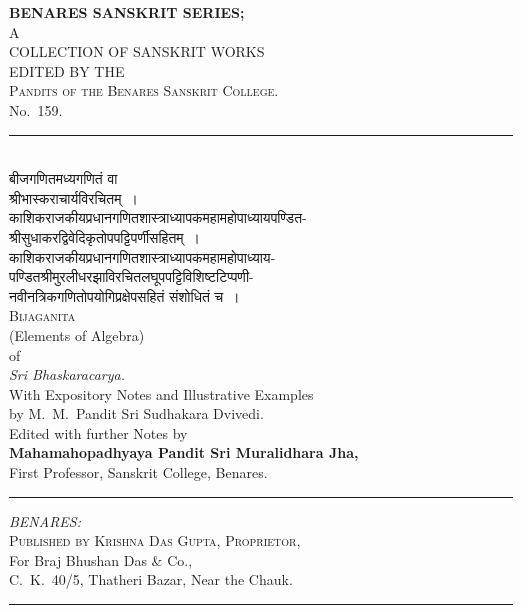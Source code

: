 \documentclass[11pt,a4paper]{article}
\newcommand{\longline}{\noindent\rule{\textwidth}{0.4pt}}
\newcommand{\shortline}{\noindent\rule{0.5\textwidth}{0.4pt}\par}
\begin{document}
\thispagestyle{empty}
\begin{center}
\vspace*{2cm}
{\LARGE\bfseries BENARES SANSKRIT SERIES;}\\[0.3cm]
{\large A}\\[0.2cm]
{\Large COLLECTION OF SANSKRIT WORKS}\\[0.4cm]
{\normalsize EDITED BY THE}\\[0.2cm]
{\large\scshape Pandits of the Benares Sanskrit College.}\\[0.3cm]
{\large No.~159.}\\[0.8cm]
\longline\\[0.5cm]
{\Huge\devanagarifont बीजगणितमध्यगणितं वा}\\[0.5cm]
{\LARGE\devanagarifont श्रीभास्कराचार्यविरचितम्~।}\\[0.8cm]
{\large\devanagarifont काशिकराजकीयप्रधानगणितशास्त्राध्यापकमहामहोपाध्यायपण्डित-}\\[0.2cm]
{\large\devanagarifont श्रीसुधाकरद्विवेदिकृतोपपट्टिपर्णीसहितम्~।}\\[0.5cm]
{\large\devanagarifont काशिकराजकीयप्रधानगणितशास्त्राध्यापकमहामहोपाध्याय-}\\[0.2cm]
{\large\devanagarifont पण्डितश्रीमुरलीधरझाविरचितलघूपपट्टिविशिष्टटिप्पणी-}\\[0.2cm]
{\large\devanagarifont नवीनत्रिकगणितोपयोगिप्रक्षेपसहितं संशोधितं च~।}\\[1cm]
{\Huge\scshape Bijaganita}\\[0.4cm]
{\Large (Elements of Algebra)}\\[0.3cm]
{\large of}\\[0.3cm]
{\large\itshape Sri Bhaskaracarya.}\\[0.5cm]
{\normalsize With Expository Notes and Illustrative Examples}\\[0.1cm]
{\normalsize by M.~M.~Pandit Sri Sudhakara Dvivedi.}\\[0.3cm]
{\normalsize Edited with further Notes by}\\[0.2cm]
{\normalsize\bfseries Mahamahopadhyaya Pandit Sri Muralidhara Jha,}\\[0.1cm]
{\small First Professor, Sanskrit College, Benares.}\\[0.6cm]
\shortline
\vspace{0.5cm}
{\large\itshape BENARES:}\\[0.3cm]
{\normalsize\scshape Published by Krishna Das Gupta, Proprietor,}\\[0.1cm]
{\small For Braj Bhushan Das \& Co.,}\\[0.1cm]
{\small C.~K.~40/5, Thatheri Bazar, Near the Chauk.}\\[0.5cm]
\longline
\end{center}
\clearpage
\end{document}

